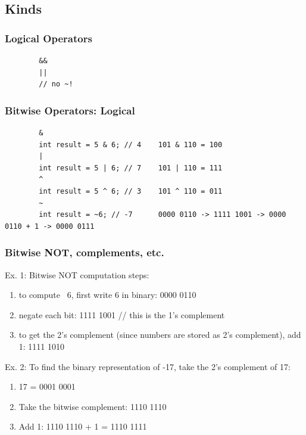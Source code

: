 \documentclass{scrartcl}
\begin{document}
\subsection{Kinds}
\subsubsection{Logical Operators}
    \begin{lstlisting}
        &&
        ||
        // no ~!
    \end{lstlisting}

\subsubsection{Bitwise Operators: Logical}
    \begin{lstlisting}
        &
        int result = 5 & 6; // 4    101 & 110 = 100
        |
        int result = 5 | 6; // 7    101 | 110 = 111
        ^
        int result = 5 ^ 6; // 3    101 ^ 110 = 011
        ~
        int result = ~6; // -7      0000 0110 -> 1111 1001 -> 0000 0110 + 1 -> 0000 0111
    \end{lstlisting}

    \subsubsection{Bitwise NOT, complements, etc.}

    Ex. 1: Bitwise NOT computation steps:

    \begin{enumerate}
        \item to compute ~6, first write 6 in binary: 0000 0110
        \item negate each bit: 1111 1001 // this is the 1's complement
        \item to get the 2's complement (since numbers are stored as 2’s complement), add 1: 1111 1010
    \end{enumerate}

    Ex. 2: To find the binary representation of -17, take the 2's complement of 17:

    \begin{enumerate}
        \item 17 = 0001 0001
        \item Take the bitwise complement: 1110 1110
        \item Add 1: 1110 1110 + 1 = 1110 1111
    \end{enumerate}
\end{document}
